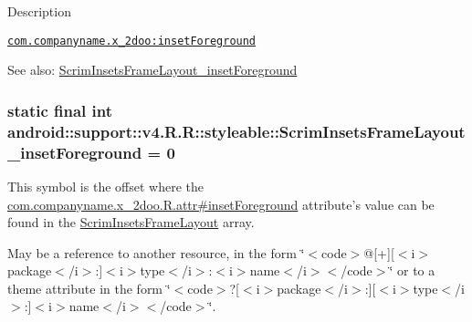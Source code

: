 Description 

{\tt \hyperlink{classandroid_1_1support_1_1v4_1_1_r_1_1styleable_aef50da4fe5b50ca44ecc45c36db73c8}{com.companyname.x\_\-2doo:insetForeground}}

\begin{Desc}
\item[See also:]\hyperlink{classandroid_1_1support_1_1v4_1_1_r_1_1styleable_aef50da4fe5b50ca44ecc45c36db73c8}{ScrimInsetsFrameLayout\_\-insetForeground} \end{Desc}
\hypertarget{classandroid_1_1support_1_1v4_1_1_r_1_1styleable_aef50da4fe5b50ca44ecc45c36db73c8}{
\subsubsection[{ScrimInsetsFrameLayout\_\-insetForeground}]{\setlength{\rightskip}{0pt plus 5cm}static final int android::support::v4.R.R::styleable::ScrimInsetsFrameLayout\_\-insetForeground = 0}}
\label{classandroid_1_1support_1_1v4_1_1_r_1_1styleable_aef50da4fe5b50ca44ecc45c36db73c8}


This symbol is the offset where the \hyperlink{classcom_1_1companyname_1_1x__2doo_1_1_r_1_1attr_9976e4f036961102fa43ccc9a6fa760e}{com.companyname.x\_\-2doo.R.attr\#insetForeground} attribute's value can be found in the \hyperlink{classandroid_1_1support_1_1v4_1_1_r_1_1styleable_e0e3b150de2aa8edce58bfe61daca7de}{ScrimInsetsFrameLayout} array.

May be a reference to another resource, in the form \char`\"{}$<$code$>$@\mbox{[}+\mbox{]}\mbox{[}$<$i$>$package$<$/i$>$:\mbox{]}$<$i$>$type$<$/i$>$:$<$i$>$name$<$/i$>$$<$/code$>$\char`\"{} or to a theme attribute in the form \char`\"{}$<$code$>$?\mbox{[}$<$i$>$package$<$/i$>$:\mbox{]}\mbox{[}$<$i$>$type$<$/i$>$:\mbox{]}$<$i$>$name$<$/i$>$$<$/code$>$\char`\"{}. 

